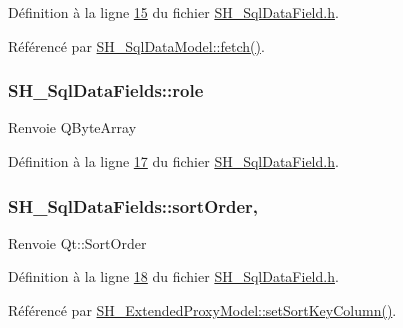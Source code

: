 Définition à la ligne \hyperlink{SH__SqlDataField_8h_source_l00015}{15} du fichier \hyperlink{SH__SqlDataField_8h_source}{S\-H\-\_\-\-Sql\-Data\-Field.\-h}.



Référencé par \hyperlink{classSH__SqlDataModel_ab6c206088250a66ddc8cb8d33a38e421}{S\-H\-\_\-\-Sql\-Data\-Model\-::fetch()}.

\hypertarget{classSH__SqlDataFields_ab6e952a2dfb87525307e7aff36ac8abc}{
\subsubsection[{role}]{\setlength{\rightskip}{0pt plus 5cm}S\-H\-\_\-\-Sql\-Data\-Fields\-::role\hspace{0.3cm}{\ttfamily [read]}}}\label{classSH__SqlDataFields_ab6e952a2dfb87525307e7aff36ac8abc}
\begin{DoxyReturn}{Renvoie}
Q\-Byte\-Array 
\end{DoxyReturn}


Définition à la ligne \hyperlink{SH__SqlDataField_8h_source_l00017}{17} du fichier \hyperlink{SH__SqlDataField_8h_source}{S\-H\-\_\-\-Sql\-Data\-Field.\-h}.

\hypertarget{classSH__SqlDataFields_a67b20d296535d6b9dda6c85f75427ad1}{
\subsubsection[{sort\-Order}]{\setlength{\rightskip}{0pt plus 5cm}S\-H\-\_\-\-Sql\-Data\-Fields\-::sort\-Order\hspace{0.3cm}{\ttfamily [read]}, {\ttfamily [write]}}}\label{classSH__SqlDataFields_a67b20d296535d6b9dda6c85f75427ad1}
\begin{DoxyReturn}{Renvoie}
Qt\-::\-Sort\-Order 
\end{DoxyReturn}


Définition à la ligne \hyperlink{SH__SqlDataField_8h_source_l00018}{18} du fichier \hyperlink{SH__SqlDataField_8h_source}{S\-H\-\_\-\-Sql\-Data\-Field.\-h}.



Référencé par \hyperlink{classSH__ExtendedProxyModel_ab8123244a5060aa35f5bce651046b99d}{S\-H\-\_\-\-Extended\-Proxy\-Model\-::set\-Sort\-Key\-Column()}.

